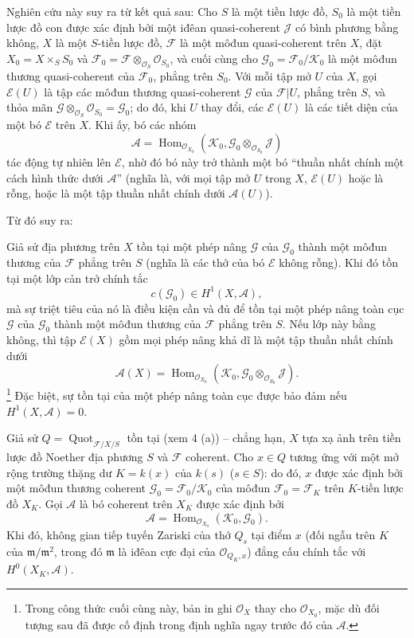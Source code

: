 
Nghiên cứu này suy ra từ kết quả sau:
 Cho $S$ là một tiền lược đồ, $S_0$ là một tiền lược đồ con
được xác định bởi một iđêan quasi-coherent $\mathcal J$ có bình phương bằng
không, $X$ là một $S$-tiền lược đồ, $\mathcal F$ là một môđun quasi-coherent
trên $X$, đặt $X_0=X\times_SS_0$ và
$\mathcal F_0=\mathcal F\otimes_{\mathcal O_S}\mathcal O_{S_0}$, và cuối cùng
cho $\mathcal G_0=\mathcal F_0/\mathcal K_0$ là một môđun thương
quasi-coherent của $\mathcal F_0$, phẳng trên $S_0$. Với mỗi tập mở $U$ của
$X$, gọi $\mathcal E(U)$ là tập các môđun thương quasi-coherent $\mathcal G$
của $\mathcal F|U$, phẳng trên $S$, và thỏa mãn
$\mathcal G\otimes_{\mathcal O_S}\mathcal O_{S_0}=\mathcal G_0$; do đó, khi
$U$ thay đổi, các $\mathcal E(U)$ là các tiết diện của một bó $\mathcal E$
trên $X$. Khi ấy, bó các nhóm
\[
\mathcal A=\operatorname{Hom}_{\mathcal O_{X_0}}
(\mathcal K_0,\mathcal G_0\otimes_{\mathcal O_{S_0}}\mathcal J)
\]
tác động tự nhiên lên $\mathcal E$, nhờ đó bó này trở thành một bó
``thuần nhất chính một cách hình thức dưới $\mathcal A$'' (nghĩa là, với mọi
tập mở $U$ trong $X$, $\mathcal E(U)$ hoặc là rỗng, hoặc là một tập thuần nhất
chính dưới $\mathcal A(U)$).

Từ đó suy ra:

 Giả sử địa phương trên $X$ tồn tại một phép nâng
$\mathcal G$ của $\mathcal G_0$ thành một môđun thương của $\mathcal F$ phẳng
trên $S$ (nghĩa là các thớ của bó $\mathcal E$ không rỗng). Khi đó tồn tại một
lớp cản trở chính tắc
\[
c(\mathcal G_0)\in H^1(X,\mathcal A),
\]
mà sự triệt tiêu của nó là điều kiện cần và đủ để tồn tại một phép nâng toàn
cục $\mathcal G$ của $\mathcal G_0$ thành một môđun thương của $\mathcal F$
phẳng trên $S$. Nếu lớp này bằng không, thì tập $\mathcal E(X)$ gồm mọi phép
nâng khả dĩ là một tập thuần nhất chính dưới
\[
\mathcal A(X)=\operatorname{Hom}_{\mathcal O_{X_0}}
(\mathcal K_0,\mathcal G_0\otimes_{\mathcal O_{S_0}}\mathcal J).
\]
\footnote{Trong công thức cuối cùng này, bản in ghi $\mathcal O_X$ thay cho
$\mathcal O_{X_0}$, mặc dù đối tượng sau đã được cố định trong định nghĩa
ngay trước đó của $\mathcal A$.}
Đặc biệt, sự tồn tại của một phép nâng toàn cục được bảo đảm nếu
$H^1(X,\mathcal A)=0$.

 Giả sử
$Q=\operatorname{Quot}_{\mathcal F/X/S}$ tồn tại (xem 4 (a)) -- chẳng hạn,
$X$ tựa xạ ảnh trên tiền lược đồ Noether địa phương $S$ và $\mathcal F$ coherent. Cho
$x\in Q$ tương ứng với một mở rộng trường thặng dư $K=k(x)$ của $k(s)$
($s\in S$):
do đó, $x$ được xác định bởi một môđun thương coherent
$\mathcal G_0=\mathcal F_0/\mathcal K_0$ của môđun
$\mathcal F_0=\mathcal F_K$ trên $K$-tiền lược đồ $X_K$. Gọi $\mathcal A$ là
bó coherent trên $X_K$ được xác định bởi
\[
\mathcal A=\operatorname{Hom}_{\mathcal O_{X_0}}(\mathcal K_0,\mathcal G_0).
\]
Khi đó, không gian tiếp tuyến Zariski của thớ $Q_s$ tại điểm $x$ (đối ngẫu trên
$K$ của $\mathfrak m/\mathfrak m^2$, trong đó $\mathfrak m$ là iđêan cực đại
của $\mathcal O_{Q_K,x}$) đẳng cấu chính tắc với $H^0(X_K,\mathcal A)$.


